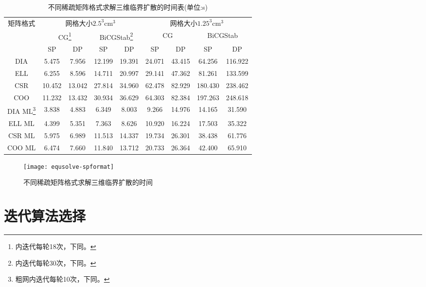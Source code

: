 \begin{table}
\centering
\begin{minipage}{\linewidth}
\centering
\caption[不同稀疏矩阵格式求解三维临界扩散的时间表]
{\label{tab:equsolve.spformat}%
不同稀疏矩阵格式求解三维临界扩散的时间表(单位:s)
}
\small
\begin{tabular}{ccccccccc}
\toprule
 \multirow {3}{*}{矩阵格式}  &
       \multicolumn{4}{c}{网格大小$2.5^3\mathrm{cm}^3$}
       &\multicolumn{4}{c}{网格大小$1.25^3\mathrm{cm}^3$} \\
 &\multicolumn{2}{c}{CG\footnote{内迭代每轮18次，下同。}}
 	   &\multicolumn{2}{c}{BiCGStab\footnote{内迭代每轮30次，下同。}}
       & \multicolumn{2}{c}{CG}& \multicolumn{2}{c}{BiCGStab}\\
 & SP& DP& SP& DP& SP& DP& SP& DP\\
\midrule
 DIA&  5.475&  7.956& 12.199& 19.391& 24.071& 43.415&  64.256& 116.922\\
 ELL&  6.255&  8.596& 14.711& 20.997& 29.141& 47.362&  81.261& 133.599\\
 CSR& 10.452& 13.042& 27.814& 34.960& 62.478& 82.929& 180.430& 238.462\\
 COO& 11.232& 13.432& 30.934& 36.629& 64.303& 82.384& 197.263& 248.618\\
 DIA ML\footnote{粗网内迭代每轮10次，下同。}
       &  3.838&  4.883&  6.349&  8.003&  9.266& 14.976&  14.165&  31.590\\
 ELL ML&  4.399&  5.351&  7.363&  8.626& 10.920& 16.224&  17.503&  35.322\\
 CSR ML&  5.975&  6.989& 11.513& 14.337& 19.734& 26.301&  38.438&  61.776\\
 COO ML&  6.474&  7.660& 11.840& 13.712& 20.733& 26.364&  42.400&  65.910\\
\bottomrule
\end{tabular}
\end{minipage}
\end{table}

\begin{figure}
\centering
\texttt{[image: equsolve-spformat]}
\caption{\label{fig:equsolve.spformat}不同稀疏矩阵格式求解三维临界扩散的时间}
\end{figure}


\section{迭代算法选择}

